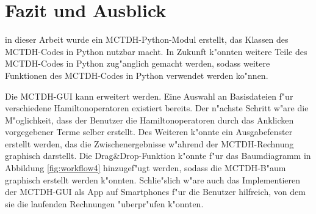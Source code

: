 \chapter{Fazit und Ausblick}

in dieser Arbeit wurde ein MCTDH-Python-Modul erstellt, das Klassen des MCTDH-Codes in Python nutzbar macht.
In Zukunft k"onnten weitere Teile des MCTDH-Codes in Python zug"anglich gemacht werden, sodass weitere Funktionen
des MCTDH-Codes in Python verwendet werden ko"nnen.


Die MCTDH-GUI kann erweitert werden. Eine Auswahl an Basisdateien f"ur verschiedene Hamiltonoperatoren existiert bereits. Der n"achste Schritt
w"are die M"oglichkeit, dass der Benutzer die Hamiltonoperatoren durch das Anklicken vorgegebener Terme selber erstellt. 
Des Weiteren k"onnte ein Ausgabefenster erstellt werden, das die Zwischenergebnisse w"ahrend der MCTDH-Rechnung graphisch darstellt.
Die Drag\&Drop-Funktion k"onnte f"ur das Baumdiagramm in Abbildung \ref{fig:workflow4} hinzugef"ugt werden, sodass die MCTDH-B"aum
graphisch erstellt werden k"onnten.
Schlie"slich w"are auch das Implementieren der MCTDH-GUI als App auf Smartphones f"ur die Benutzer hilf\-reich, von dem sie die laufenden Rechnungen
"uberpr"ufen k"onnten. 
